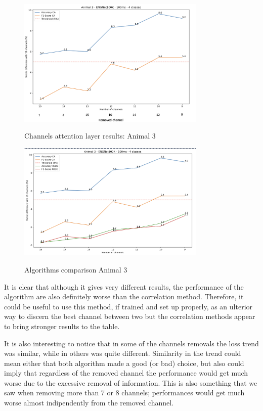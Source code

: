 \documentclass{Configuration_Files/PoliMi3i_thesis}
\begin{document}
\begin{figure}[H]
    \centering
    \includegraphics[width=0.8\textwidth]{Results Matteo/figure15}
    \label{fiure_15}
    \caption{Channels attention layer results: Animal 3}
\end{figure}

\begin{figure}[H]
    \centering
    \includegraphics[width=0.8\textwidth]{Results Matteo/figure16}
    \label{fiure_16}
    \caption{Algorithms comparison Animal 3}
\end{figure}

It is clear that although it gives very different results, the performance of the algorithm are also definitely worse than the correlation method.
Therefore, it could be useful to use this method, if trained and set up properly, as an ulterior way to discern the best channel between two but the correlation methods appear to bring stronger results to the table.

It is also interesting to notice that in some of the channels removals the loss trend was similar, while in others was quite different.
Similarity in the trend could mean either that both algorithm made a good (or bad) choice, but also could imply that regardless of the removed channel the performance would get much worse due to the excessive removal of information.
This is also something that we saw when removing more than 7 or 8 channels; performances would get much worse almost indipendently from the removed channel.
\end{document}
